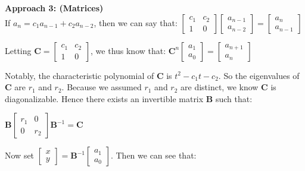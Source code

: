 \documentclass{book}
\newcommand{\hTwo}{%
\color{MidnightBlue}%
   \fontsize{13}{15}\selectfont%
}
\newenvironment{myIndent}{%
   \begin{adjustwidth}{2.5em}{0em}%
}{%
   \end{adjustwidth}%
}
\newcommand{\blab}[1]{\textbf{#1}}
\newcommand{\retTwo}{\hfill\bigbreak}
\begin{document}
\begin{myIndent}\hTwo
   \blab{Approach 3: (Matrices)}\\
   If $a_n = c_1a_{n-1} + c_2a_{n-2}$, then we can say that: $\begin{bmatrix}c_1 & c_2 \\ 1 & 0\end{bmatrix}\begin{bmatrix}a_{n-1} \\ a_{n-2}\end{bmatrix} = \begin{bmatrix}a_n \\ a_{n-1}\end{bmatrix}$\retTwo

   Letting $\bm{C} = 
   \begin{bmatrix}
      c_1 & c_2 \\ 1 & 0
   \end{bmatrix}$, we thus know that: $\bm{C}^n \begin{bmatrix}a_1 \\ a_0\end{bmatrix} = \begin{bmatrix}a_{n+1} \\ a_{n}\end{bmatrix}$\retTwo

   Notably, the characteristic polynomial of $\bm{C}$ is $t^2 - c_1t - c_2$. So the eigenvalues of $\bm{C}$ are $r_1$ and $r_2$. Because we assumed $r_1$ and $r_2$ are distinct, we know $\bm{C}$  is\\ diagonalizable. Hence there exists an invertible matrix $\bm{B}$ such that:
   
   {\center$\bm{B}
   \begin{bmatrix}
      r_1 & 0 \\ 0 & r_2
   \end{bmatrix}\bm{B}^{-1} = \bm{C}$\retTwo\par}

   Now set $\begin{bmatrix} x \\ y\end{bmatrix} = \bm{B}^{-1}\begin{bmatrix} a_1 \\ a_0\end{bmatrix}$. Then we can see that:


\end{myIndent}
\end{document}
